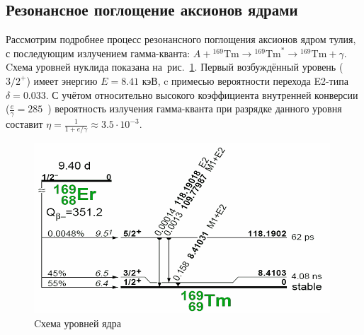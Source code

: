 \documentclass[a4paper,article,14pt]{extarticle}
\begin{document}
\subsection{Резонансное поглощение аксионов ядрами {\Tm}}

Рассмотрим подробнее процесс резонансного поглощения аксионов ядром тулия, с последующим излучением гамма-кванта: $A + {}^{169}\mathrm{Tm} \rightarrow {}^{169}\mathrm{Tm}^{*} \rightarrow {}^{169}\mathrm{Tm} + \gamma$.
Cхема уровней нуклида {\Tm} показана на~рис.~\ref{tmlvls}.
Первый возбуждённый уровень ($3/2^+$) имеет энергию $E = 8.41 \text{\ кэВ}$, c  примесью вероятности перехода E2-типа $\delta = 0.033$.
С учётом относительно высокого коэффициента внутренней конверсии ($\frac{e}{\gamma} = 285$~\cite{lederer1978table}) вероятность излучения гамма-кванта при разрядке данного уровня составит $\eta = \frac{1}{1 + e/\gamma} \approx 3.5 \cdot 10^{-3}$.
\begin{figure}[t]
    \centering
    \includegraphics[width = 0.75 \textwidth]{images/Tmlevels.png}
    \caption{Cхема уровней ядра {\Tm}~\cite{lederer1978table}}\label{tmlvls}
\end{figure}
\end{document}
